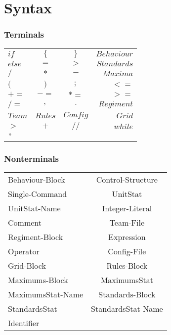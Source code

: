 \section{Syntax}
	\subsubsection{Terminals}
		
		\begin{tabular}{ l c c r}
			$if  	 $& $\{ 	 $&$ \} 	  $&$ Behaviour$  \\
		  	$else	 $&$ = 		 $&$ >  	  $&$ Standards$  \\
		 	$/ 		 $&$ *  	 $&$ -  	  $&$ Maxima$	  \\
		 	$( 		 $&$ )  	 $&$ ;  	  $&$ < =$		  \\
		 	$+= 	 $&$ -=   	 $&$ *= 	  $&$ > =$	    \\
		 	$/= 	 $&$ ,     	 $&$ .  	  $&$ Regiment$   \\
			$Team	 $&$ Rules   $&$ Config   $&$ Grid$	   \\
			$>		 $&$   + 	 $&$ //	 	  $&$ while $   \\
			$ "		 $& 		&			& 		\\
		\end{tabular}
	\subsubsection{Nonterminals}
		\begin{tabular}{l c}
			Behaviour-Block   & Control-Structure   \\
			Single-Command    & UnitStat 			\\
			UnitStat-Name	  & Integer-Literal		\\
			Comment			  & Team-File 			\\
			Regiment-Block	  & Expression			\\
			Operator		  & Config-File			\\
			Grid-Block	      & Rules-Block 		\\
			Maximums-Block	  & MaximumsStat		\\
			MaximumsStat-Name & Standards-Block	 	\\
			StandardsStat	  & StandardsStat-Name 	\\
			Identifier		  & 					\\
		\end{tabular}
	
